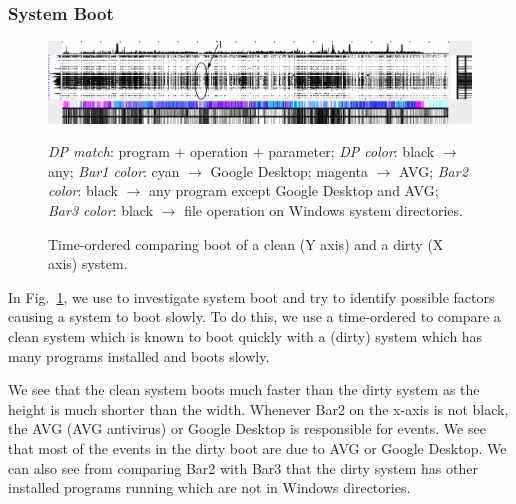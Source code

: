 \subsubsection{System Boot}
\label{sec:boot}

\begin{figure}[htb]
\includegraphics[width=1.0\textwidth]{lviz/boot-dp.png}
\caption{Time-ordered \VDP{} comparing boot
of a clean (Y axis) and a dirty (X axis) system.
}
\label{fig:boot-dp}
{\it DP match}: program + operation + parameter;
{\it DP color}: black $\rightarrow$ any;
{\it Bar1 color}: cyan $\rightarrow$ Google Desktop; magenta $\rightarrow$ AVG;
{\it Bar2 color}: black $\rightarrow$ any program except Google Desktop and AVG;
{\it Bar3 color}: black $\rightarrow$ file operation on Windows system directories.
\end{figure}

In Fig.~\ref{fig:boot-dp}, we use \lviz{} to investigate system boot and try to identify possible
factors causing a system to boot slowly.
To do this, we use a time-ordered \VDP{} to
compare a clean system which is known to boot quickly
with a (dirty) system which has many programs installed and boots slowly.

We see that the clean system boots much faster than the dirty system 
as the height is much shorter than the width.
Whenever Bar2 on the x-axis is not black,
the AVG (AVG antivirus) or Google Desktop is responsible for events.
We see that most of the events in the dirty boot are due to AVG or Google
Desktop.
We can also see from comparing Bar2 with Bar3
that the dirty system has other installed programs running
which are not in Windows directories.


